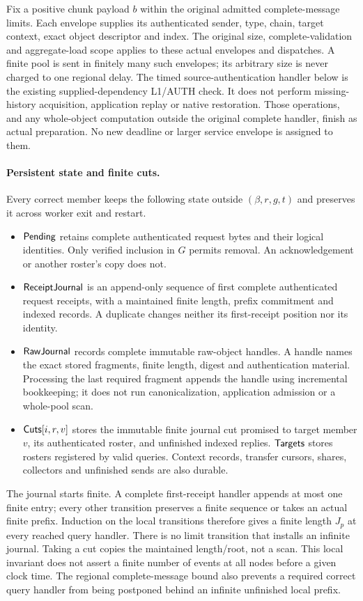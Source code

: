 Fix a positive chunk payload $b$ within the original admitted
complete-message limits. Each envelope supplies its authenticated
sender, type, chain, target context, exact object descriptor and index.
The original size, complete-validation and aggregate-load scope applies
to these actual envelopes and dispatches. A finite pool is sent in
finitely many such envelopes; its arbitrary size is never charged to
one regional delay. The timed source-authentication handler below is
the existing supplied-dependency L1/AUTH check. It does not perform
missing-history acquisition, application replay or native restoration.
Those operations, and any whole-object computation outside the original
complete handler, finish as actual preparation. No new deadline or
larger service envelope is assigned to them.

\paragraph{Persistent state and finite cuts.}
Every correct member keeps the following state outside
$(\beta,r,g,t)$ and preserves it across worker exit and restart.
\begin{itemize}[itemsep=2pt]
\item $\mathsf{Pending}$ retains complete authenticated request bytes and
their logical identities. Only verified inclusion in $G$ permits
removal. An acknowledgement or another roster's copy does not.
\item $\mathsf{ReceiptJournal}$ is an append-only sequence of first
complete authenticated request receipts, with a maintained finite
length, prefix commitment and indexed records. A duplicate changes
neither its first-receipt position nor its identity.
\item $\mathsf{RawJournal}$ records complete immutable raw-object
handles. A handle names the exact stored fragments, finite length,
digest and authentication material. Processing the last required
fragment appends the handle using incremental bookkeeping; it does not
run canonicalization, application admission or a whole-pool scan.
\item $\mathsf{Cuts}[i,r,v]$ stores the immutable finite journal cut
promised to target member $v$, its authenticated roster, and unfinished
indexed replies. $\mathsf{Targets}$ stores rosters registered by valid
queries. Context records, transfer cursors, shares, collectors and
unfinished sends are also durable.
\end{itemize}
The journal starts finite. A complete first-receipt handler appends at
most one finite entry; every other transition preserves a finite
sequence or takes an actual finite prefix. Induction on the local
transitions therefore gives a finite length $J_p$ at every reached
query handler. There is no limit transition that installs an infinite
journal. Taking a cut copies the maintained length/root, not a scan.
This local invariant does not assert a finite number of events at all
nodes before a given clock time. The regional complete-message bound
also prevents a required correct query handler from being postponed
behind an infinite unfinished local prefix.

